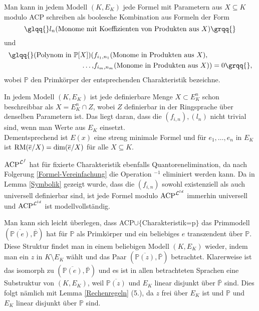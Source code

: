     \begin{corollary}\label{Formel-Vereinfachung}
    	Man kann in jedem Modell $(K,E_K)$ jede Formel mit Parametern aus $X\subseteq K$ modulo ACP schreiben als boolesche Kombination aus Formeln der Form $$\glqq{}l_n(\text{Monome mit Koeffizienten von Produkten aus }X)\grqq{}$$ und
    	\begin{align*}
    	\text{\glqq{}}(\text{Polynom in }\mathbb{P}[X])(&f_{i_1,n_1}(\text{Monome in Produkten aus }X),\\\dots,&f_{i_m,n_m}(\text{Monome in Produkten aus }X))=0\grqq{},
    	\end{align*}
        wobei $\mathbb{P}$ den Primkörper der entsprechenden Charakteristik bezeichne.
    \end{corollary}
    \begin{corollary}
    	In jedem Modell $(K,E_K)$ ist jede definierbare Menge $X\subset E_K^n$ schon beschreibbar als $X=E_K^n\cap Z$, wobei $Z$ definierbar in der Ringsprache über denselben Parametern ist. Das liegt daran, dass die $(f_{i,n}),(l_n)$ nicht trivial sind, wenn man Werte aus $E_K$ einsetzt.\\ Dementsprechend ist $E(x)$ eine streng minimale Formel und für $e_1,\dots,e_n$ in $E_K$ ist $\operatorname{RM}(\overline{e}/X)=\dim(\overline{e}/X)$ für alle $X\subseteq K$.
    \end{corollary}
    \begin{corollary}
    	$\operatorname{ACP}^{\mathcal{L}^f}$ hat für fixierte Charakteristik ebenfalls Quantorenelimination, da nach Folgerung \ref{Formel-Vereinfachung} die Operation \glqq{}$^{-1}$\grqq{} eliminiert werden kann. Da in Lemma \ref{Symbolik} gezeigt wurde, dass die $(f_{i,n})$ sowohl existenziell als auch universell definierbar sind, ist jede Formel modulo $\operatorname{ACP}^{\mathcal{L}^{ld}}$ immerhin universell und $\operatorname{ACP}^{\mathcal{L}^{ld}}$ ist modellvollständig.
    \end{corollary}
    
    \begin{remark}
    	Man kann sich leicht überlegen, dass ACP$\cup\{$\glqq{}Charakteristik=p\grqq{}$\}$ das Primmodell $(\overline{\mathbb{P}(e)},\overline{\mathbb{P}})$ hat für $\mathbb{P}$ als Primkörper und ein beliebiges $e$ transzendent über $\mathbb{P}$. Diese Struktur findet man in einem beliebigen Modell $(K,E_K)$ wieder, indem man ein $z$ in $K\setminus E_K$ wählt und das Paar $(\overline{\mathbb{P}(z)},\overline{\mathbb{P}})$ betrachtet. Klarerweise ist das isomorph zu $(\overline{\mathbb{P}(e)},\overline{\mathbb{P}})$ und es ist in allen betrachteten Sprachen eine Substruktur von $(K,E_K)$, weil $\overline{\mathbb{P}(z)}$ und $E_K$ linear disjunkt über $\overline{\mathbb{P}}$ sind. Dies folgt nämlich mit Lemma \ref{Rechenregeln} (5.), da $z$ frei über $E_K$ ist und $\mathbb{P}$ und $E_K$ linear disjunkt über $\mathbb{P}$ sind.
    \end{remark}
    
